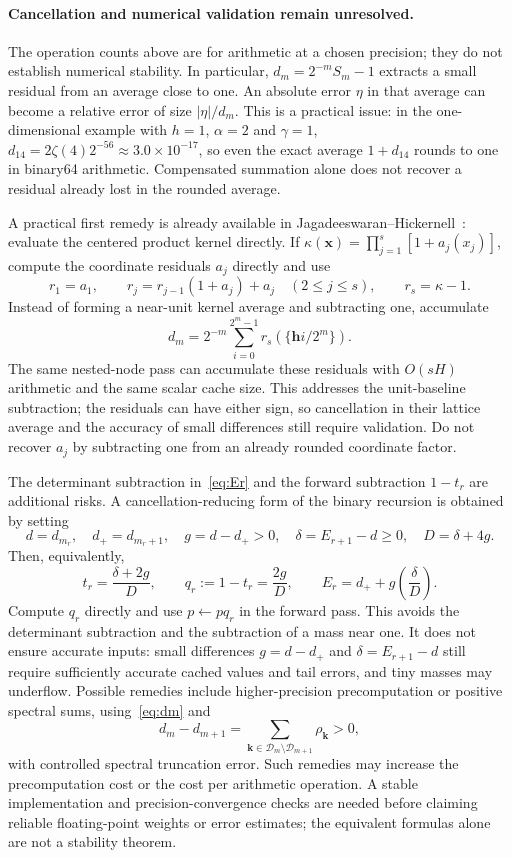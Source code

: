 \documentclass[11pt]{article}
\newcommand{\bk}{\boldsymbol{k}}
\newcommand{\bh}{\boldsymbol{h}}
\newcommand{\bx}{\boldsymbol{x}}
\begin{document}
\paragraph{Cancellation and numerical validation remain unresolved.}
The operation counts above are for arithmetic at a chosen precision;
they do not establish numerical stability. In particular,
$d_m=2^{-m}S_m-1$ extracts a small residual from an average close to
one. An absolute error $\eta$ in that average can become a relative
error of size $|\eta|/d_m$. This is a practical issue: in the
one-dimensional example with $h=1$, $\alpha=2$ and $\gamma=1$,
$d_{14}=2\zeta(4)2^{-56}\approx3.0\times10^{-17}$, so even the exact
average $1+d_{14}$ rounds to one in binary64 arithmetic.
Compensated summation alone does not recover a residual already lost
in the rounded average.

A practical first remedy is already available in
Jagadeeswaran--Hickernell~\cite[Section~4.4]{JH19}: evaluate the
centered product kernel directly. If
$\kappa(\bx)=\prod_{j=1}^s[1+a_j(x_j)]$, compute the coordinate
residuals $a_j$ directly and use
\begin{equation}\label{eq:centeredproduct}
 r_1=a_1,\qquad
 r_j=r_{j-1}(1+a_j)+a_j\quad(2\le j\le s),\qquad
 r_s=\kappa-1.
\end{equation}
Instead of forming a near-unit kernel average and subtracting one,
accumulate
\[
 d_m=2^{-m}\sum_{i=0}^{2^m-1}
 r_s\!\left(\{\bh i/2^m\}\right).
\]
The same nested-node pass can accumulate these residuals with
$O(sH)$ arithmetic and the same scalar cache size. This addresses
the unit-baseline subtraction; the residuals can have either sign,
so cancellation in their lattice average and the accuracy of small
differences still require validation. Do not recover $a_j$ by
subtracting one from an already rounded coordinate factor.

The determinant subtraction in~\eqref{eq:Er} and the forward
subtraction $1-t_r$ are additional risks. A cancellation-reducing
form of the binary recursion is obtained by setting
\[
 d=d_{m_r},\quad d_+=d_{m_r+1},\quad
 g=d-d_+>0,\quad \delta=E_{r+1}-d\ge0,\quad D=\delta+4g.
\]
Then, equivalently,
\[
 t_r=\frac{\delta+2g}{D},\qquad
 q_r:=1-t_r=\frac{2g}{D},\qquad
 E_r=d_++g\left(\frac{\delta}{D}\right).
\]
Compute $q_r$ directly and use $p\leftarrow p q_r$ in the forward
pass. This avoids the determinant subtraction and the subtraction
of a mass near one. It does not ensure accurate inputs: small
differences $g=d-d_+$ and $\delta=E_{r+1}-d$ still require sufficiently
accurate cached values and tail errors, and tiny masses may underflow.
Possible remedies include higher-precision precomputation or positive
spectral sums, using~\eqref{eq:dm} and
\[
 d_m-d_{m+1}
 =\sum_{\bk\in\mathcal D_m\setminus\mathcal D_{m+1}}\rho_{\bk}>0,
\]
with controlled spectral truncation error. Such remedies may increase
the precomputation cost or the cost per arithmetic operation.
A stable implementation and precision-convergence checks are needed
before claiming reliable floating-point weights or error estimates;
the equivalent formulas alone are not a stability theorem.
\end{document}
